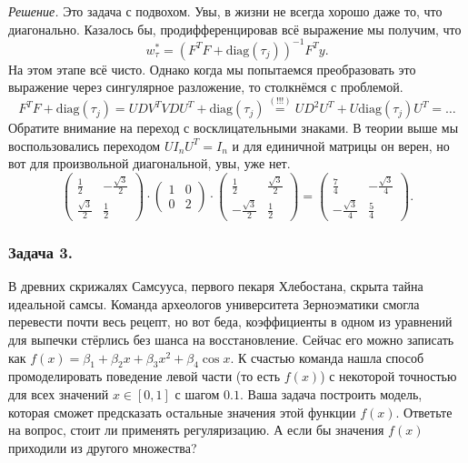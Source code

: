 \noindent\textit{Решение.} Это задача с подвохом. Увы, в жизни не всегда хорошо даже то, что диагонально. Казалось бы, продифференцировав всё выражение мы получим, что
$$w_\tau^* = (F^TF + \text{diag}(\tau_j))^{-1} F^Ty.$$
На этом этапе всё чисто. Однако когда мы попытаемся преобразовать это выражение через сингулярное разложение, то столкнёмся с проблемой.
$$F^TF + \text{diag}(\tau_j) = UDV^TVDU^T + \text{diag}(\tau_j) \overset{(!!!)}{=} UD^2U^T + U\text{diag}(\tau_j)U^T = \dots$$
Обратите внимание на переход с восклицательными знаками. В теории выше мы воспользовались переходом $U I_n U^T = I_n$ и для единичной матрицы он верен, но вот для произвольной диагональной, увы, уже нет.
$$\begin{pmatrix}
    \frac{1}{2} & -\frac{\sqrt{3}}{2} \\
    \frac{\sqrt{3}}{2} & \frac{1}{2}
\end{pmatrix} \cdot \begin{pmatrix}
    1 & 0 \\
    0 & 2
\end{pmatrix} \cdot \begin{pmatrix}
    \frac{1}{2} & \frac{\sqrt{3}}{2} \\
    -\frac{\sqrt{3}}{2} & \frac{1}{2}
\end{pmatrix} = \begin{pmatrix}
    \frac{7}{4} & -\frac{\sqrt{3}}{4} \\
    -\frac{\sqrt{3}}{4} & \frac{5}{4}
\end{pmatrix}.$$

\subsubsection*{Задача 3.} В древних скрижалях Самсууса, первого пекаря Хлебостана, скрыта тайна идеальной самсы. Команда археологов университета Зерноэматики смогла перевести почти весь рецепт, но вот беда, коэффициенты в одном из уравнений для выпечки стёрлись без шанса на восстановление. Сейчас его можно записать как $f(x) = \beta_1 + \beta_2 x + \beta_3 x^2 + \beta_4 \cos x$. К счастью команда нашла способ промоделировать поведение левой части (то есть $f(x)$) с некоторой точностью для всех значений $x \in [0, 1]$ с шагом $0.1$. Ваша задача построить модель, которая сможет предсказать остальные значения этой функции $f(x)$. Ответьте на вопрос, стоит ли применять регуляризацию. А если бы значения $f(x)$ приходили из другого множества?

